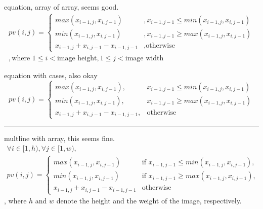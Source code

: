 equation, array of array, seems good.
\begin{equation}
	\begin{array}{r}
		pv(i, j) = \left\{ 
		\begin{array}{rl}
			max(x_{i - 1, j}, x_{i, j - 1})                & , x_{i - 1, j - 1} \leq min(x_{i - 1, j}, x_{i, j - 1}) \\
			min(x_{i - 1, j}, x_{i, j - 1})                & , x_{i - 1, j - 1} \geq max(x_{i - 1, j}, x_{i, j - 1}) \\
			x_{i - 1, j} + x_{i, j - 1} - x_{i - 1, j - 1} & ,  \textrm{otherwise}
		\end{array} \right.
		\\
		, \textrm{where } 1 \leq i < \textrm{image height}, 1 \leq j < \textrm{image width}
	\end{array}
\end{equation}

equation with cases, also okay
\begin{equation}
	pv(i, j) = 
	\begin{cases}
		max(x_{i - 1, j}, x_{i, j - 1})                ,& x_{i - 1, j - 1} \leq min(x_{i - 1, j}, x_{i, j - 1}) \\
		min(x_{i - 1, j}, x_{i, j - 1})                ,& x_{i - 1, j - 1} \geq max(x_{i - 1, j}, x_{i, j - 1}) \\
		x_{i - 1, j} + x_{i, j - 1} - x_{i - 1, j - 1} ,& \textrm{otherwise}
	\end{cases} 
\end{equation}

\rule{\linewidth}{1px}

multline with array, this seems fine.
\begin{multline}
	\forall i \in [1, h), \forall j \in [1, w), \\
	pv(i, j) = \left\{ 
	\begin{array}{rl}
		max(x_{i - 1, j}, x_{i, j - 1})                & \text{if } x_{i - 1, j - 1} \leq min(x_{i - 1, j}, x_{i, j - 1}), \\
		min(x_{i - 1, j}, x_{i, j - 1})                & \text{if } x_{i - 1, j - 1} \geq max(x_{i - 1, j}, x_{i, j - 1}), \\
		x_{i - 1, j} + x_{i, j - 1} - x_{i - 1, j - 1} & \text{otherwise}
	\end{array} \right.
\end{multline}
, where  $h$  and  $w$  denote the height and the weight of the image, respectively.

